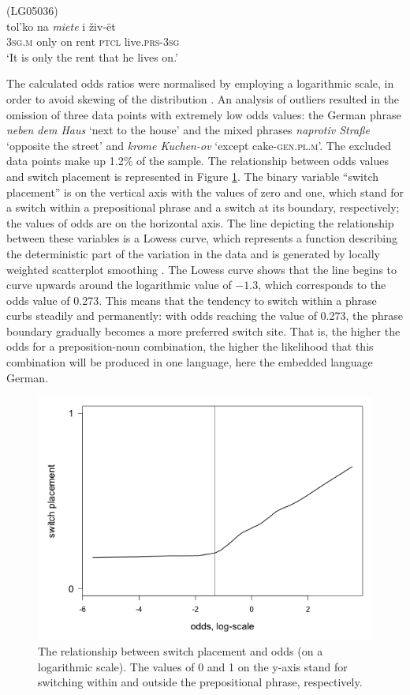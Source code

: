 \ea
(LG05036)\label{ex:5:13}\\
 {tol'ko} {na} \textit{miete} {i} {živ-ët}\\
	{3\textsc{sg.m}} only on rent \textsc{ptcl} live.\textsc{prs-3sg}\\
\glt `It is only the rent that he lives on.'
\z

The calculated odds ratios were normalised by employing a logarithmic scale, in order to avoid skewing of the distribution \citep[cf.][31]{baayen-analyzing}. An analysis of outliers \citep[cf.][258]{gries2009} resulted in the omission of three data points with extremely low odds values: the German phrase \textit{neben dem Haus} `next to the house' and the mixed phrases \textit{naprotiv Straße} `opposite the street' and \textit{krome Kuchen-ov} `except cake-\textsc{gen.pl.m}'. The excluded data points make up 1.2\% of the sample. The relationship between odds values and switch placement is represented in Figure \ref{fig:5:2}. The binary variable “switch placement” is on the vertical axis with the values of zero and one, which stand for a switch within a prepositional phrase and a switch at its boundary, respectively; the values of odds are on the horizontal axis. The line depicting the relationship between these variables is a Lowess curve, which represents a function describing the deterministic part of the variation in the data and is generated by locally weighted scatterplot smoothing \citep{lowess}. The Lowess curve shows that the line begins to curve upwards around the logarithmic value of $-1.3$, which corresponds to the odds value of 0.273. This means that the tendency to switch within a phrase curbs steadily and permanently: with odds reaching the value of 0.273, the phrase boundary gradually becomes a more preferred switch site. That is, the higher the odds for a preposition-noun combination, the higher the likelihood that this combination will be produced in one language, here the embedded language German.

\begin{figure}
	   	\includegraphics[scale=0.5]{figures/5-Figure_2.png}	
		\caption{The relationship between switch placement and odds (on a logarithmic scale). The values of 0 and 1 on the y-axis stand for switching within and outside the prepositional phrase, respectively.}
	\label{fig:5:2}
\end{figure}


